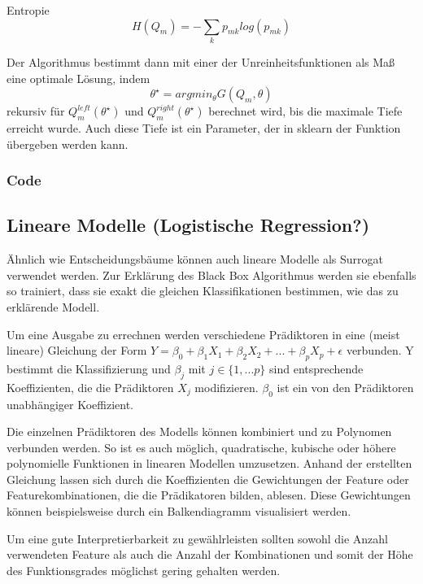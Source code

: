 \begin{definition}
	Entropie
	\[H(Q_m)= -\sum_k p_{mk} log(p_{mk})\]
\end{definition}


Der Algorithmus bestimmt dann mit einer der Unreinheitsfunktionen als Maß eine optimale Lösung, indem \[\theta^{\star} = argmin_{\theta} G (Q_m, \theta)\] rekursiv für $Q_m^{left}(\theta^{\star})$ und $Q_m^{right}(\theta^{\star})$ berechnet wird, bis die maximale Tiefe erreicht wurde. Auch diese Tiefe ist ein Parameter, der in sklearn der Funktion übergeben werden kann.  \cite{}

\subsubsection{Code}
\label{subsubsection: DT Code}

\subsection{Lineare Modelle (Logistische Regression?)}
\label{subsection: Lin}
Ähnlich wie Entscheidungsbäume können auch lineare Modelle als Surrogat verwendet werden. Zur Erklärung des Black Box Algorithmus werden sie ebenfalls so trainiert, dass sie exakt die gleichen Klassifikationen bestimmen, wie das zu erklärende Modell.

Um eine Ausgabe zu errechnen werden verschiedene Prädiktoren in eine (meist lineare) Gleichung der Form $Y = \beta_0 + \beta_1 X_1 + \beta_2 X_2 + ... + \beta_p X_p + \epsilon$ verbunden. Y bestimmt die Klassifizierung und $\beta_j$ mit $j \in \{1,... p\}$ sind entsprechende Koeffizienten, die die Prädiktoren $X_j$ modifizieren. $\beta_0$ ist ein von den Prädiktoren unabhängiger Koeffizient. \cite{ISLRBuchLinear}

Die einzelnen Prädiktoren des Modells können kombiniert und zu Polynomen verbunden werden. So ist es auch möglich, quadratische, kubische oder höhere polynomielle Funktionen in linearen Modellen umzusetzen. \cite{ISLRBuch} Anhand der erstellten Gleichung lassen sich durch die Koeffizienten die Gewichtungen der Feature oder Featurekombinationen, die die Prädikatoren bilden, ablesen. \cite{ISLRBuch} Diese Gewichtungen können beispielsweise durch ein Balkendiagramm visualisiert werden.

Um eine gute Interpretierbarkeit zu gewählrleisten sollten sowohl die Anzahl verwendeten Feature als auch die Anzahl der Kombinationen und somit der Höhe des Funktionsgrades möglichst gering gehalten werden. \cite{ISLRBuch, RudinStopExplaining}


